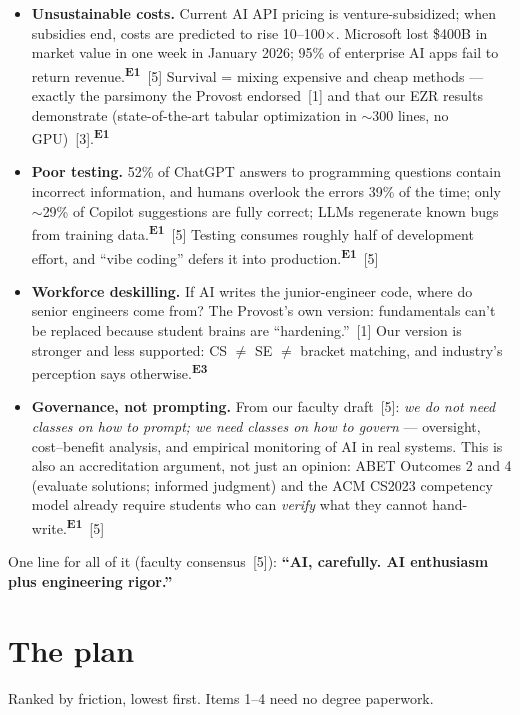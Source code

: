 \documentclass[11pt]{article}
\newcommand{\Ecite}{\textsuperscript{\color{wolf}\sffamily\bfseries E1}}   %
\newcommand{\Epos}{\textsuperscript{\color{inkgray}\sffamily\bfseries E3}} %
\begin{document}
\begin{itemize}[itemsep=2pt]
\item \textbf{Unsustainable costs.} Current AI API pricing is venture-subsidized; when subsidies end, costs are predicted to rise 10--100$\times$. Microsoft lost \$400B in market value in one week in January 2026; 95\% of enterprise AI apps fail to return revenue.\Ecite~[5] Survival = mixing expensive and cheap methods --- exactly the parsimony the Provost endorsed~[1] and that our EZR results demonstrate (state-of-the-art tabular optimization in $\sim$300 lines, no GPU)~[3].\Ecite
\item \textbf{Poor testing.} 52\% of ChatGPT answers to programming questions contain incorrect information, and humans overlook the errors 39\% of the time; only $\sim$29\% of Copilot suggestions are fully correct; LLMs regenerate known bugs from training data.\Ecite~[5] Testing consumes roughly half of development effort, and ``vibe coding'' defers it into production.\Ecite~[5]
\item \textbf{Workforce deskilling.} If AI writes the junior-engineer code, where do senior engineers come from? The Provost's own version: fundamentals can't be replaced because student brains are ``hardening.''~[1] Our version is stronger and less supported: CS $\neq$ SE $\neq$ bracket matching, and industry's perception says otherwise.\Epos
\item \textbf{Governance, not prompting.} From our faculty draft~[5]: \emph{we do not need classes on how to prompt; we need classes on how to govern} --- oversight, cost--benefit analysis, and empirical monitoring of AI in real systems. This is also an accreditation argument, not just an opinion: ABET Outcomes 2 and 4 (evaluate solutions; informed judgment) and the ACM CS2023 competency model already require students who can \emph{verify} what they cannot hand-write.\Ecite~[5]
\end{itemize}

One line for all of it (faculty consensus~[5]): \textbf{``AI, carefully. AI enthusiasm plus engineering rigor.''}

\section{The plan}

Ranked by friction, lowest first. Items 1--4 need no degree paperwork.
\end{document}
